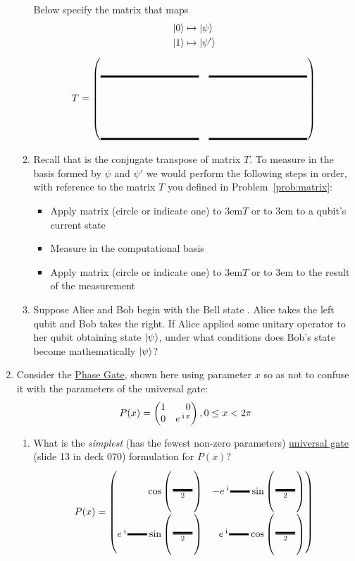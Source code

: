 \documentclass[12pt]{article}
\begin{document}
\begin{enumerate}
\begin{enumerate}[label=\theenumi.\arabic*]
Below specify the matrix that maps
\begin{align*}
    \ket{0} &\mapsto \ket{\psi} \\
    \ket{1} &\mapsto \ket{\psi'}
\end{align*}
\[
T = \begin{pmatrix*}[r]
\Blank[10em]{} & \Blank[10em]{} \\[4em]
\Blank[10em]{} & \Blank[10em]{}
\end{pmatrix*}
\]
\item{} Recall that  is the conjugate transpose of matrix $T$.  To measure in the basis formed by $\psi$ and $\psi'$ we would perform the following steps in order, with reference to the matrix $T$ you defined in Problem~\ref{prob:matrix}:
\begin{itemize}
    \item Apply matrix (circle or indicate one) \hbox to 3em{\hss$T$\hss} or \hbox to 3em{\hss{}\hss}  to a qubit's current state
    \item Measure in the computational basis
    \item Apply matrix (circle or indicate one) \hbox to 3em{\hss$T$\hss} or \hbox to 3em{\hss{}\hss}  to the result of the measurement
\end{itemize}
\item{} Suppose Alice and Bob begin with the Bell state . Alice takes the left qubit and Bob takes the right. If Alice applied some unitary operator  to her qubit obtaining state $\ket{\psi_{}}$, under what conditions does Bob's state become mathematically $\ket{\psi_{}}$?
\LeaveSpace{}
\end{enumerate}
\item\label{prob:phasegate} Consider the \href{https://docs.quantum.ibm.com/api/qiskit/qiskit.circuit.library.PhaseGate}{Phase Gate}, shown here using parameter $x$ so as not to confuse it with the parameters of the universal  gate:
\[
P(x) = \SQBG{\relax}{1}{0}{0}{\ExpPhase{x}}, 0\leq x < 2\pi
\]
\begin{enumerate}[label=\theenumi.\arabic*]
  \item{} What is the \emph{simplest} (has the fewest non-zero parameters) \href{https://docs.quantum.ibm.com/api/qiskit/qiskit.circuit.library.UGate}{universal gate} (slide 13 in deck 070) formulation for $P(x)$?
  \[
  P(x) = \SQBG{\relax}{\cos{\left(\frac{\Blank[2em]}{2}\right)}}{-\ExpPhase{\Blank[2em]}\sin{\left(\frac{\Blank[2em]}{2}\right)}}{\ExpPhase{\Blank[2em]}\sin{\left(\frac{\Blank[2em]}{2}\right)}}{\ExpPhase{\Blank[2em]}\cos{\left(\frac{\Blank[2em]}{2}\right)}}
\]
\end{enumerate}
\end{enumerate}
\end{document}
